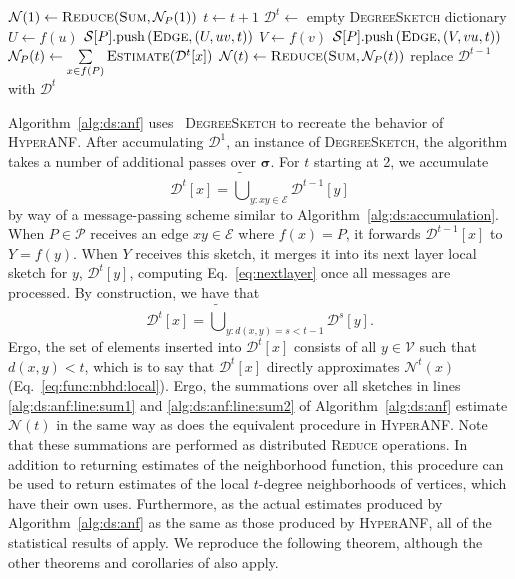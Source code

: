 \documentclass[10]{report}
\newcommand{\push}[1]{\text{push} \left ( #1 \right )}
\newcommand{\algoname}[1]{\textnormal{\textsc{#1}}}
\begin{document}
\begin{algorithm}[htbp]
\begin{flushleft}
\begin{algorithmic}[1]
		\State $\mathcal{N}(1) \gets \algoname{Reduce}(\algoname{Sum}, \mathcal{N}_P(1))$
			\State $t \gets t + 1$
			\State $\mathcal{D}^t \gets $ empty \algoname{DegreeSketch} dictionary
				\State $U \gets f(u)$
	 			\State $\mathcal{S}[P].\push{\algoname{Edge}, (U, uv, t)}$
				\State $V \gets f(v)$
 				\State $\mathcal{S}[P].\push{\algoname{Edge}, (V, vu, t)}$
			\EndWhile
			\State $\mathcal{N}_P(t) \gets \sum\limits_{x \in f(P)} \algoname{Estimate}(\mathcal{D}^t[x])$ \label{alg:ds:anf:line:sum2}
			\State $\mathcal{N}(t) \gets \algoname{Reduce}(\algoname{Sum}, \mathcal{N}_P(t))$
			\State replace $\mathcal{D}^{t-1}$ with $\mathcal{D}^t$
		\EndWhile
\end{algorithmic}
\end{flushleft}
\end{algorithm}

Algorithm~\ref{alg:ds:anf} uses ~\algoname{DegreeSketch} to recreate the behavior of \algoname{HyperANF}.
After accumulating $\mathcal{D}^1$, an instance of \algoname{DegreeSketch}, the algorithm takes a number of additional passes over $\boldsymbol{\sigma}$. 
For $t$ starting at 2, we accumulate 
%
\begin{equation} \label{eq:nextlayer}
\mathcal{D}^t[x] = \widetilde{\bigcup}_{y: xy \in \mathcal{E}} \mathcal{D}^{t-1}[y]
\end{equation}
%
by way of a message-passing scheme similar to Algorithm~\ref{alg:ds:accumulation}.
When $P \in \mathcal{P}$ receives an edge $xy \in \mathcal{E}$ where $f(x) = P$, it forwards $\mathcal{D}^{t-1}[x]$ to $Y = f(y)$.
When $Y$ receives this sketch, it merges it into its next layer local sketch for $y$, $\mathcal{D}^t[y]$, computing Eq.~\eqref{eq:nextlayer} once all messages are processed.
By construction, we have that
%
\begin{equation} \label{eq:nextlayer:full}
\mathcal{D}^t[x] = \widetilde{\bigcup}_{y: d(x,y) = s < t-1} \mathcal{D}^{s}[y].
\end{equation}
%
Ergo, the set of elements inserted into $\mathcal{D}^t[x]$ consists of all $y \in \mathcal{V}$ such that $d(x,y) < t$, which is to say that $\mathcal{D}^t[x]$ directly approximates $\mathcal{N}^t(x)$ (Eq.~\eqref{eq:func:nbhd:local}). 
Ergo, the summations over all sketches in lines \ref{alg:ds:anf:line:sum1} and \ref{alg:ds:anf:line:sum2} of Algorithm~\ref{alg:ds:anf} estimate $\mathcal{N}(t)$ in the same way as does the equivalent procedure in \algoname{HyperANF}.
Note that these summations are performed as distributed \algoname{Reduce} operations.
In addition to returning estimates of the neighborhood function, this procedure can be used to return estimates of the local $t$-degree neighborhoods of vertices, which have their own uses.
Furthermore, as the actual estimates produced by Algorithm~\ref{alg:ds:anf} as the same as those produced by \algoname{HyperANF}, all of the statistical results of \cite{boldi2011hyperanf} apply.
We reproduce the following theorem, although the other theorems and corollaries of \cite{boldi2011hyperanf} also apply. 
\end{document}
